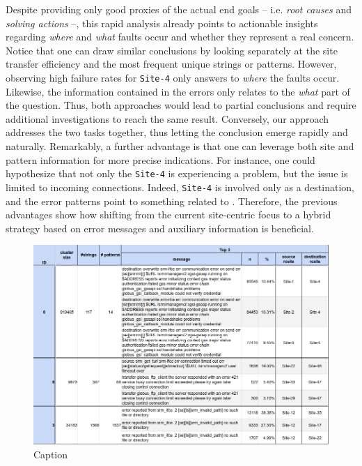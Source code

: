Despite providing only good proxies of the actual end goals -- i.e. \textit{root causes} and \textit{solving actions} --, this rapid analysis already points to actionable insights regarding \textit{where} and \textit{what} faults occur and whether they represent a real concern.
Notice that one can draw similar conclusions by looking separately at the site transfer efficiency and the most frequent unique strings or patterns. 
However, observing high failure rates for \texttt{Site-4} only answers to \textit{where} the faults occur. 
Likewise, the information contained in the errors only relates to the \textit{what} part of the question.
Thus, both approaches would lead to partial conclusions and require additional investigations to reach the same result.
Conversely, our approach addresses the two tasks together, thus letting the conclusion emerge rapidly and naturally. 
Remarkably, a further advantage is that one can leverage both site and pattern information for more precise indications.
For instance, one could hypothesize that not only the \texttt{Site-4} is experiencing a problem, but the issue is limited to incoming connections. Indeed, \texttt{Site-4} is involved only as a destination, and the error patterns point to something related to .
Therefore, the previous advantages show how shifting from the current site-centric focus to a hybrid strategy based on error messages and auxiliary information is beneficial.
\begin{landscape}
\begin{figure}
    \centering
    \includegraphics[width=\linewidth]{figures/510_results/timeplots/table-successes.png}
    \caption{Caption}
    \label{fig:cluster_summary:successes}
\end{figure}
\end{landscape}

